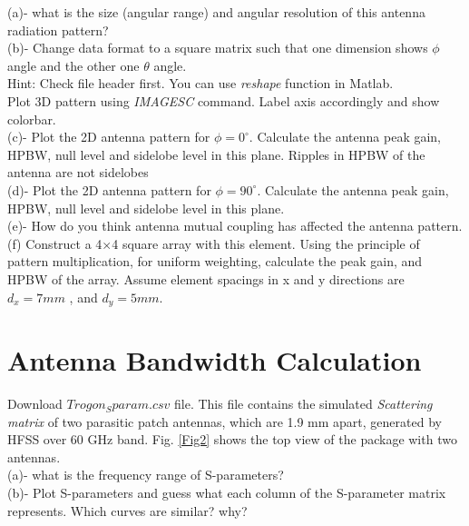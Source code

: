 \documentclass[paper=a4, fontsize=11pt]{scrartcl} %
\numberwithin{equation}{section} %
\numberwithin{figure}{section} %
\numberwithin{table}{section} %
\begin{document}
(a)- what is the size (angular range) and angular resolution of this antenna radiation pattern?\\ 

(b)- Change data format to a square matrix such that one dimension shows $\phi$ angle and the other one $\theta$ angle.\\ 
Hint: Check file header first. You can use \emph{reshape}  function in Matlab.\\

Plot 3D pattern using \emph{IMAGESC} command. Label axis accordingly and show colorbar.\\

(c)- Plot the 2D antenna pattern for $\phi =0^\circ$. Calculate the antenna peak gain, HPBW, null level and sidelobe level in this plane. Ripples in HPBW of the antenna are not sidelobes\\

(d)- Plot the 2D antenna pattern for $\phi =90^\circ$. Calculate the antenna peak gain, HPBW, null level and sidelobe level in this plane.\\

(e)- How do you think antenna mutual coupling has affected the antenna pattern.\\

(f) Construct a 4$\times$4 square array with this element. Using the principle of pattern multiplication, for uniform weighting, calculate the peak gain, and HPBW of the array. Assume element spacings in x and y directions are  $d_x=7 mm$ ,  and $d_y=5 mm$.


\section{Antenna Bandwidth Calculation}

Download $Trogon_Sparam.csv$ file. This file contains the simulated \emph{Scattering matrix} of two  parasitic patch antennas, which are 1.9 mm apart, generated by HFSS over 60 GHz band. Fig. \ref{Fig2} shows the top view of the package with two antennas.\\


(a)- what is the frequency range of S-parameters?\\

(b)- Plot S-parameters and guess what each column of the S-parameter matrix represents. Which curves are similar? why?\\
\end{document}
